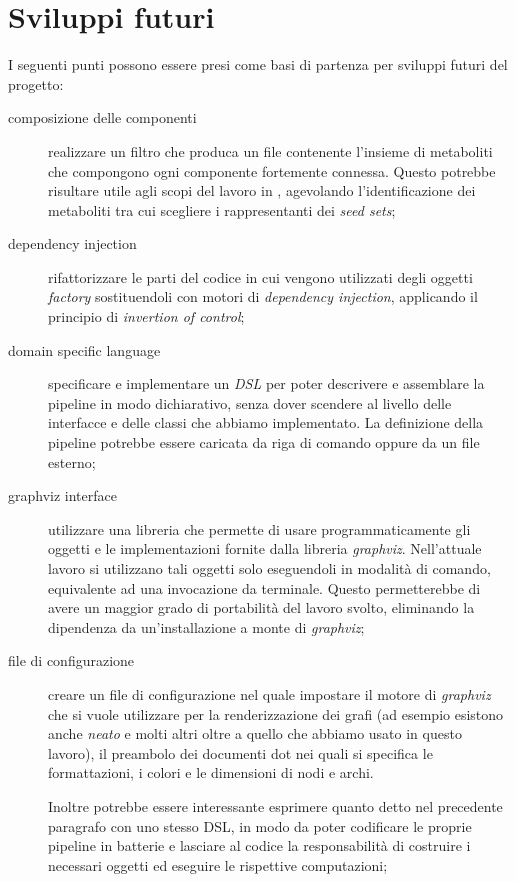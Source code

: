 \section{Sviluppi futuri}

I seguenti punti possono essere presi come basi di partenza per
sviluppi futuri del progetto:
\begin{description}
\item[composizione delle componenti] realizzare un filtro che produca
  un file contenente l'insieme di metaboliti che compongono ogni
  componente fortemente connessa. Questo potrebbe risultare utile agli
  scopi del lavoro in \cite{large-scale-reconstruction}, agevolando
  l'identificazione dei metaboliti tra cui scegliere i rappresentanti
  dei \emph{seed sets};
\item[dependency injection] rifattorizzare le parti del codice in cui
  vengono utilizzati degli oggetti \emph{factory} sostituendoli con
  motori di \emph{dependency injection}, applicando il principio di
  \emph{invertion of control};
\item[domain specific language] specificare e implementare un
  \emph{DSL} per poter descrivere e assemblare la pipeline in modo
  dichiarativo, senza dover scendere al livello delle interfacce e
  delle classi che abbiamo implementato. La definizione della pipeline
  potrebbe essere caricata da riga di comando oppure da un file
  esterno;
\item[graphviz interface] utilizzare una libreria che permette di
  usare programmaticamente gli oggetti e le implementazioni fornite
  dalla libreria \emph{graphviz}. Nell'attuale lavoro si utilizzano
  tali oggetti solo eseguendoli in modalit\`a di comando, equivalente
  ad una invocazione da terminale. Questo permetterebbe di avere un
  maggior grado di portabilit\`a del lavoro svolto, eliminando la
  dipendenza da un'installazione a monte di \emph{graphviz};
\item[file di configurazione] creare un file di configurazione nel
  quale impostare il motore di \emph{graphviz} che si vuole utilizzare
  per la renderizzazione dei grafi (ad esempio esistono anche
  \emph{neato} e molti altri oltre a quello che abbiamo usato in
  questo lavoro), il preambolo dei documenti dot nei quali si
  specifica le formattazioni, i colori e le dimensioni di nodi e
  archi.

  Inoltre potrebbe essere interessante esprimere quanto detto nel
  precedente paragrafo con uno stesso DSL, in modo da poter codificare
  le proprie pipeline in batterie e lasciare al codice la
  responsabilit\`a di costruire i necessari oggetti ed eseguire le
  rispettive computazioni;


\end{description}
